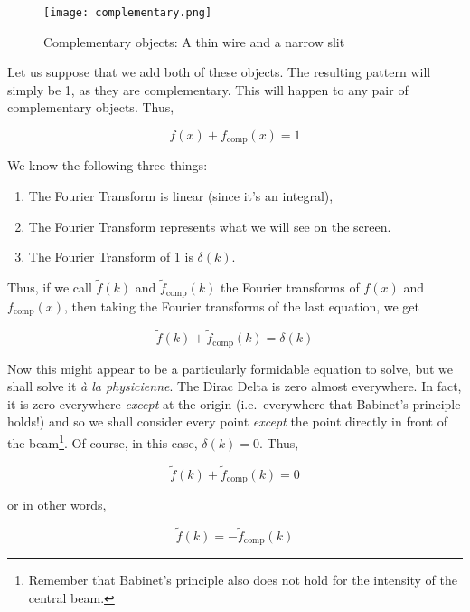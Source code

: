 \begin{figure}[!htb]
\centering
\texttt{[image: complementary.png]}
\caption{Complementary objects: A thin wire and a narrow slit}
\label{img_complementary}
\end{figure}

Let us suppose that we add both of these objects. The resulting pattern will simply be 1, as they are complementary. This will happen to any pair of complementary objects. Thus,

\begin{equation*}
f(x) + f_\text{comp}(x) = 1
\end{equation*}

We know the following three things:

\begin{enumerate}
\item The Fourier Transform is linear (since it's an integral),
\item The Fourier Transform represents what we will see on the screen.
\item The Fourier Transform of 1 is $\delta(k)$.
\end{enumerate}

Thus, if we call $\widetilde{f}(k)$ and $\widetilde{f}_\text{comp}(k)$ the Fourier transforms of $f(x)$ and $f_\text{comp}(x)$, then taking the Fourier transforms of the last equation, we get

\begin{equation*}
\widetilde{f}(k) + \widetilde{f}_\text{comp}(k) = \delta(k)
\end{equation*}

Now this might appear to be a particularly formidable equation to solve, but we shall solve it \textit{à la physicienne}. The Dirac Delta is zero almost everywhere. In fact, it is zero everywhere \textit{except} at the origin (i.e.\ everywhere that Babinet's principle holds!) and so we shall consider every point \textit{except} the point directly in front of the beam\footnote{Remember that Babinet's principle also does not hold for the intensity of the central beam.}. Of course, in this case, $\delta(k) = 0$. Thus,

\begin{equation*}
\widetilde{f}(k) + \widetilde{f}_\text{comp}(k) = 0
\end{equation*}

or in other words,

\begin{equation*}
\widetilde{f}(k) = - \widetilde{f}_\text{comp}(k)
\end{equation*}

